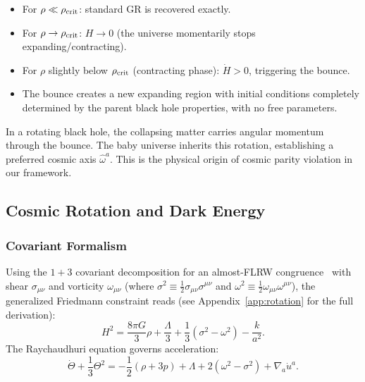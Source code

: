 \documentclass[aps,prd,twocolumn,superscriptaddress,showpacs,preprintnumbers,nofootinbib,longbibliography,floatfix]{revtex4-2}
\newcommand{\rhocrit}{\rho_{\rm crit}}
\begin{document}
\begin{itemize}[leftmargin=*]
\item For $\rho \ll \rhocrit$: standard GR is recovered exactly.
\item For $\rho \to \rhocrit$: $H \to 0$ (the universe momentarily stops expanding/contracting).
\item For $\rho$ slightly below $\rhocrit$ (contracting phase): $\dot{H} > 0$, triggering the bounce.
\item The bounce creates a new expanding region with initial conditions completely determined by the parent black hole properties, with no free parameters.
\end{itemize}

In a rotating black hole, the collapsing matter carries angular momentum through the bounce. The baby universe inherits this rotation, establishing a preferred cosmic axis $\hat{\omega}^a$. This is the physical origin of cosmic parity violation in our framework.


\subsection{Cosmic Rotation and Dark Energy}\label{sec:rotation}

\subsubsection{Covariant Formalism}

Using the $1+3$ covariant decomposition for an almost-FLRW congruence~\cite{Ellis1989} with shear $\sigma_{\mu\nu}$ and vorticity $\omega_{\mu\nu}$ (where $\sigma^2\equiv\frac{1}{2}\sigma_{\mu\nu}\sigma^{\mu\nu}$ and $\omega^2\equiv\frac{1}{2}\omega_{\mu\nu}\omega^{\mu\nu}$), the generalized Friedmann constraint reads (see Appendix~\ref{app:rotation} for the full derivation):
\begin{equation}\label{eq:genfriedmann}
H^2 = \frac{8\pi G}{3}\rho + \frac{\Lambda}{3}+\frac{1}{3}(\sigma^2-\omega^2)-\frac{k}{a^2}.
\end{equation}
The Raychaudhuri equation governs acceleration:
\begin{equation}\label{eq:raychaudhuri}
\dot{\Theta}+\frac{1}{3}\Theta^2=-\frac{1}{2}(\rho+3p)+\Lambda+2(\omega^2-\sigma^2)+\nabla_a\dot{u}^a.
\end{equation}
\end{document}
